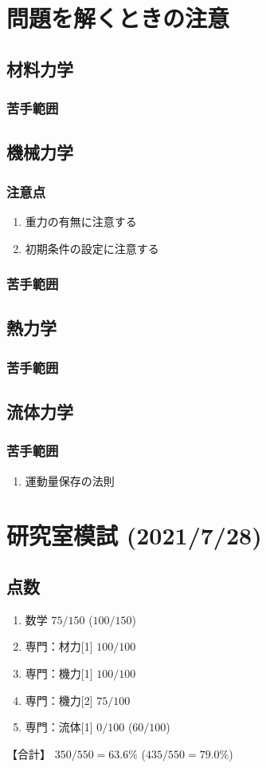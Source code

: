 \documentclass[a4paper]{jsarticle}
\begin{document}
\section{問題を解くときの注意}
\subsection{材料力学}
\subsubsection{苦手範囲}
\subsection{機械力学}
\subsubsection{注意点}
\begin{enumerate}[(1)]
    \item 重力の有無に注意する
    \item 初期条件の設定に注意する
\end{enumerate}
\subsubsection{苦手範囲}
\subsection{熱力学}
\subsubsection{苦手範囲}
\subsection{流体力学}
\subsubsection{苦手範囲}
\begin{enumerate}[(1)]
    \item 運動量保存の法則
\end{enumerate}
\newpage
\section{研究室模試 (2021/7/28)}
\subsection{点数}
\begin{enumerate}[(1)]
    \item 数学 \qquad \qquad $75/150$ ($100/150$)
    \item 専門：材力[1] $100/100$
    \item 専門：機力[1] $100/100$
    \item 専門：機力[2] $75/100$
    \item 専門：流体[1] $0/100$ ($60/100$)
\end{enumerate}
【合計】 $350/550 = 63.6 \%$ \quad ($435/550 = 79.0\%$)
\end{document}
